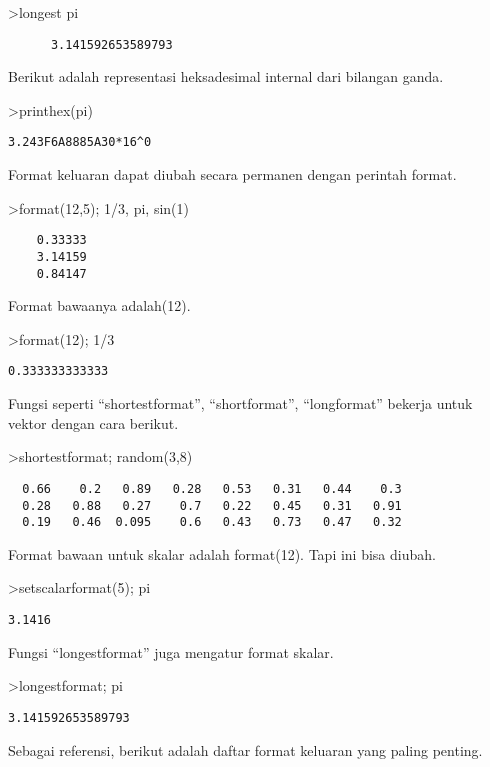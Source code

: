 \documentclass[
]{book}
\begin{document}
\textgreater longest pi

\begin{verbatim}
      3.141592653589793 
\end{verbatim}

Berikut adalah representasi heksadesimal internal dari bilangan ganda.

\textgreater printhex(pi)

\begin{verbatim}
3.243F6A8885A30*16^0
\end{verbatim}

Format keluaran dapat diubah secara permanen dengan perintah format.

\textgreater format(12,5); 1/3, pi, sin(1)

\begin{verbatim}
    0.33333 
    3.14159 
    0.84147 
\end{verbatim}

Format bawaanya adalah(12).

\textgreater format(12); 1/3

\begin{verbatim}
0.333333333333
\end{verbatim}

Fungsi seperti ``shortestformat'', ``shortformat'', ``longformat'' bekerja untuk vektor dengan cara berikut.

\textgreater shortestformat; random(3,8)

\begin{verbatim}
  0.66    0.2   0.89   0.28   0.53   0.31   0.44    0.3 
  0.28   0.88   0.27    0.7   0.22   0.45   0.31   0.91 
  0.19   0.46  0.095    0.6   0.43   0.73   0.47   0.32 
\end{verbatim}

Format bawaan untuk skalar adalah format(12). Tapi ini bisa diubah.

\textgreater setscalarformat(5); pi

\begin{verbatim}
3.1416
\end{verbatim}

Fungsi ``longestformat'' juga mengatur format skalar.

\textgreater longestformat; pi

\begin{verbatim}
3.141592653589793
\end{verbatim}

Sebagai referensi, berikut adalah daftar format keluaran yang paling penting.
\end{document}
